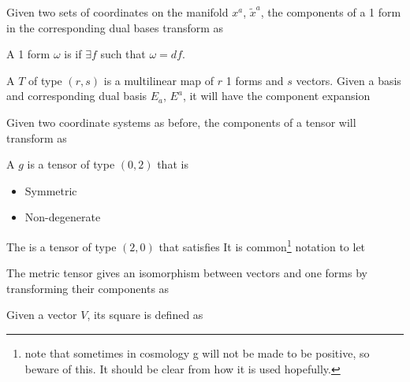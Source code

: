 \documentclass{article}
\begin{document}
\begin{lemma}
Given two sets of coordinates on the manifold $x^a$, $\tilde{x}^a$, the components of a 1 form in the corresponding dual bases transform as 
\end{lemma}

\begin{definition}[Exact]
A 1 form $\omega$ is  if $\exists f$ such that $\omega = df$. 
\end{definition}

\begin{definition}[Tensor]
A  $T$ of type $(r,s)$ is a multilinear map of $r$ 1 forms and $s$ vectors. Given a basis and corresponding dual basis $E_a$, $E^a$, it will have the component expansion 
\end{definition}

\begin{lemma}
Given two coordinate systems as before, the components of a tensor will transform as 
\end{lemma}

\begin{definition}[Metric]
A  $g$ is a tensor of type $(0,2)$ that is 
\begin{itemize}
    \item Symmetric
    \item Non-degenerate
\end{itemize}
The  is a tensor of type $(2,0)$ that satisfies
It is common\footnote{note that sometimes in cosmology g will not be made to be positive, so beware of this. It should be clear from how it is used hopefully.} notation to let 
\end{definition}

\begin{lemma}
The metric tensor gives an isomorphism between vectors and one forms by transforming their components as 
\end{lemma}

\begin{definition}
Given a vector $V$, its square is defined as 
\end{definition}
\end{document}
